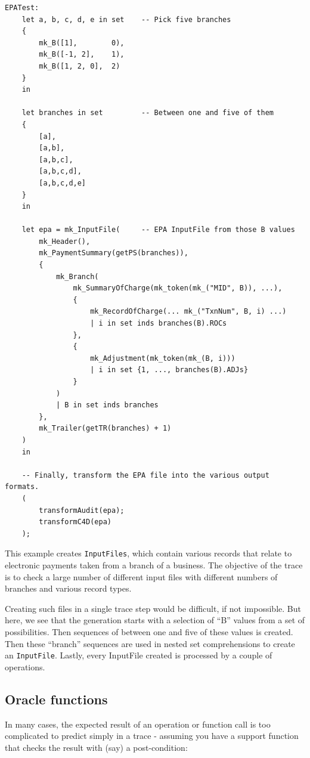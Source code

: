 \documentclass{overturerepchap}
\begin{document}
\scriptsize
\begin{lstlisting}
EPATest:
    let a, b, c, d, e in set    -- Pick five branches
    {
        mk_B([1],        0),
        mk_B([-1, 2],    1),
        mk_B([1, 2, 0],  2)
    }
    in

    let branches in set         -- Between one and five of them
    {
        [a],
        [a,b],
        [a,b,c],
        [a,b,c,d],
        [a,b,c,d,e]
    }
    in
 
    let epa = mk_InputFile(     -- EPA InputFile from those B values
        mk_Header(),
        mk_PaymentSummary(getPS(branches)),
        {
            mk_Branch(
                mk_SummaryOfCharge(mk_token(mk_("MID", B)), ...),
                {
                    mk_RecordOfCharge(... mk_("TxnNum", B, i) ...)
                    | i in set inds branches(B).ROCs
                },
                {
                    mk_Adjustment(mk_token(mk_(B, i)))
                    | i in set {1, ..., branches(B).ADJs}
                }
            )
            | B in set inds branches
        },
        mk_Trailer(getTR(branches) + 1)
    )
    in

    -- Finally, transform the EPA file into the various output formats.
    (
        transformAudit(epa);
        transformC4D(epa)
    );
\end{lstlisting}
\normalsize

\noindent This example creates \texttt{InputFiles}, which contain various records that
relate to electronic payments taken from a branch of a business. The objective of the
trace is to check a large number of different input files with different numbers
of branches and various record types.

Creating such files in a single trace step would be difficult, if not
impossible. But here, we see that the generation starts with a selection of
``B'' values from a set of possibilities. Then sequences of between one and five
of these values is created. Then these ``branch'' sequences are used in nested
set comprehensions to create an \texttt{InputFile}. Lastly, every InputFile
created is processed by a couple of operations.

\subsection{Oracle functions}

In many cases, the expected result of an operation or function call is too
complicated to predict simply in a trace - assuming you have a support function
that checks the result with (say) a post-condition:
\end{document}
